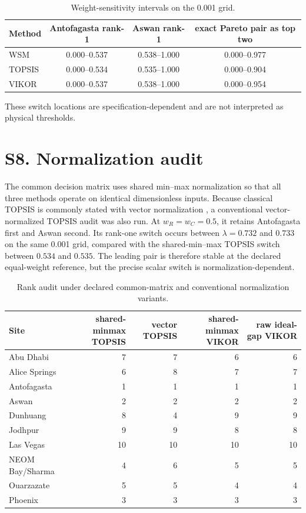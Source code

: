 \documentclass[11pt]{article}
\begin{document}
\begin{table}[htbp]
\centering
\caption{Weight-sensitivity intervals on the 0.001 grid.}
\label{tab:s1_sens}
\small
\begin{tabular}{lccc}
\toprule
Method & Antofagasta rank-1 & Aswan rank-1 & exact Pareto pair as top two \\
\midrule
WSM & 0.000--0.537 & 0.538--1.000 & 0.000--0.977 \\
TOPSIS & 0.000--0.534 & 0.535--1.000 & 0.000--0.904 \\
VIKOR & 0.000--0.537 & 0.538--1.000 & 0.000--0.954 \\
\bottomrule
\end{tabular}
\end{table}

These switch locations are specification-dependent and are not interpreted as physical thresholds.

\section*{S8. Normalization audit}
The common decision matrix uses shared min--max normalization so that all three methods operate on identical dimensionless inputs. Because classical TOPSIS is commonly stated with vector normalization \cite{hwang1981,opricovic2004}, a conventional vector-normalized TOPSIS audit was also run. At $w_R=w_C=0.5$, it retains Antofagasta first and Aswan second. Its rank-one switch occurs between $\lambda=0.732$ and $0.733$ on the same 0.001 grid, compared with the shared-min--max TOPSIS switch between $0.534$ and $0.535$. The leading pair is therefore stable at the declared equal-weight reference, but the precise scalar switch is normalization-dependent.

\begin{table}[htbp]
\centering
\caption{Rank audit under declared common-matrix and conventional normalization variants.}
\scriptsize
\begin{tabular}{lrrrr}
\toprule
Site & shared-minmax TOPSIS & vector TOPSIS & shared-minmax VIKOR & raw ideal-gap VIKOR \\
\midrule
Abu Dhabi & 7 & 7 & 6 & 6 \\
Alice Springs & 6 & 8 & 7 & 7 \\
Antofagasta & 1 & 1 & 1 & 1 \\
Aswan & 2 & 2 & 2 & 2 \\
Dunhuang & 8 & 4 & 9 & 9 \\
Jodhpur & 9 & 9 & 8 & 8 \\
Las Vegas & 10 & 10 & 10 & 10 \\
NEOM Bay/Sharma & 4 & 6 & 5 & 5 \\
Ouarzazate & 5 & 5 & 4 & 4 \\
Phoenix & 3 & 3 & 3 & 3 \\
\bottomrule
\end{tabular}
\end{table}
\end{document}
